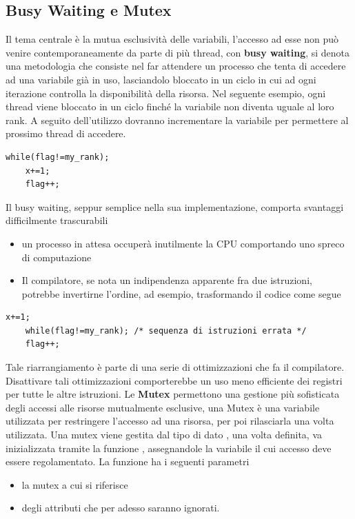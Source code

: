 \documentclass[10pt, letterpaper]{report}
\begin{document}
\subsection{Busy Waiting e Mutex}
Il tema centrale è la mutua esclusività delle variabili, l'accesso ad esse non può venire contemporaneamente da parte 
di più thread, con \textbf{busy waiting}, si denota una metodologia che consiste nel far attendere un processo che tenta 
di accedere ad una variabile già in uso, lasciandolo bloccato in un ciclo in cui ad ogni iterazione 
controlla la disponibilità della risorsa.\acc 
Nel seguente esempio, ogni thread viene bloccato in un ciclo finché la variabile  non 
diventa uguale al loro rank. A seguito dell'utilizzo dovranno incrementare la variabile per permettere 
al prossimo thread di accedere.
\begin{lstlisting}[style=CStyle]
    while(flag!=my_rank);
    x+=1;
    flag++;
\end{lstlisting}
Il busy waiting, seppur semplice nella sua implementazione, comporta svantaggi difficilmente trascurabili\begin{itemize}
    \item un processo in attesa occuperà inutilmente la CPU comportando uno spreco di computazione 
    \item Il compilatore, se nota un indipendenza apparente fra due istruzioni, potrebbe invertirne l'ordine, ad esempio, 
    trasformando il codice come segue
\end{itemize}
\begin{lstlisting}[style=CStyle]
    x+=1;
    while(flag!=my_rank); /* sequenza di istruzioni errata */
    flag++;
\end{lstlisting}
Tale riarrangiamento è parte di una serie di ottimizzazioni che fa il compilatore. Disattivare tali ottimizzazioni 
comporterebbe un uso meno efficiente dei registri per tutte le altre istruzioni.\acc 
Le \textbf{Mutex} permettono una gestione più sofisticata degli accessi alle risorse mutualmente 
esclusive, una Mutex è una variabile utilizzata per restringere l'accesso ad una risorsa, per poi 
rilasciarla una volta utilizzata.\acc 
Una mutex viene gestita dal tipo di dato , una volta definita, va inizializzata 
tramite la funzione , 
assegnandole la variabile il cui accesso deve essere regolamentato. La funzione ha i seguenti 
parametri\begin{itemize}
    \item {} la mutex a cui si riferisce 
    \item {} degli attributi che per adesso saranno ignorati.
\end{itemize}
\end{document}
